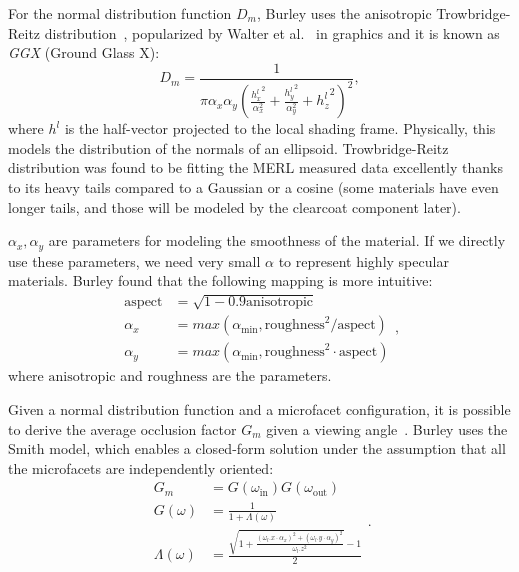 For the normal distribution function $D_m$, Burley uses the anisotropic Trowbridge-Reitz distribution~\cite{Trowbridge:1975:AIR}, popularized by Walter et al.~\cite{Walter:2007:MMR} in graphics and it is known as \emph{GGX} (Ground Glass X):
\begin{equation}
D_m = \frac{1}{\pi \alpha_x \alpha_y \left(\frac{{h^l_x}^2}{\alpha_x^2} + \frac{{h^l_y}^2}{\alpha_y^2} + {h^l_z}^2\right)^2},
\end{equation}
where $h^l$ is the half-vector projected to the local shading frame. Physically, this models the distribution of the normals of an ellipsoid. Trowbridge-Reitz distribution was found to be fitting the MERL measured data excellently thanks to its heavy tails compared to a Gaussian or a cosine (some materials have even longer tails, and those will be modeled by the clearcoat component later). 

$\alpha_x, \alpha_y$ are parameters for modeling the smoothness of the material. If we directly use these parameters, we need very small $\alpha$ to represent highly specular materials. Burley found that the following mapping is more intuitive:
\begin{equation}
\begin{aligned}
\text{aspect} &= \sqrt{1 - 0.9 \text{anisotropic}} \\
\alpha_x &= max(\alpha_{\text{min}}, \text{roughness}^2 / \text{aspect}) \\
\alpha_y &= max(\alpha_{\text{min}}, \text{roughness}^2 \cdot \text{aspect})
\end{aligned},
\end{equation}
where $\text{anisotropic}$ and $\text{roughness}$ are the parameters.

Given a normal distribution function and a microfacet configuration, it is possible to derive the average occlusion factor $G_m$ given a viewing angle~\cite{Heitz:2014:UMF}. Burley uses the Smith model, which enables a closed-form solution under the assumption that all the microfacets are independently oriented:
\begin{equation}
\begin{aligned}
G_m &= G(\omega_{\text{in}}) G(\omega_{\text{out}}) \\
G(\omega) &= \frac{1}{1 + \Lambda(\omega)} \\
\Lambda(\omega) &= \frac{\sqrt{1 + \frac{\left(\omega_l.x \cdot \alpha_x\right)^2 + \left(\omega_l.y \cdot \alpha_y\right)^2}{\omega_l.z^2}} - 1}{2}
\end{aligned}.
\end{equation}

